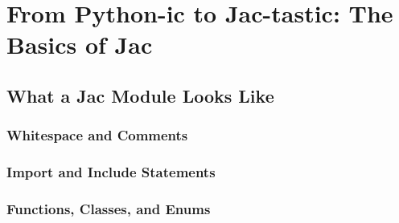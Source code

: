 \chapter{From Python-ic to Jac-tastic: The Basics of Jac}
\section{What a Jac Module Looks Like}
\subsection{Whitespace and Comments}
\subsection{Import and Include Statements}
\subsection{Functions, Classes, and Enums}
